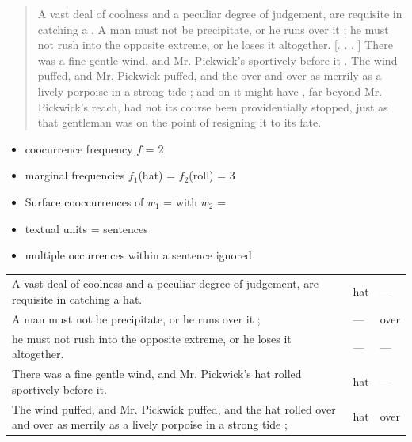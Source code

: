 \documentclass[a4paper,landscape,headrule,footrule,dvips]{foils}
\begin{document}
\begin{CJK}{UTF8}{min}
  \begin{quotation}
A vast deal of coolness and a peculiar degree of judgement, are requisite in catching a  . A man must
not be precipitate, or he runs over it ; he must not rush into the opposite extreme, or he loses it
altogether. [. . . ] There was a fine gentle \ul{wind, and Mr. Pickwick’s   sportively before it} . The
wind puffed, and Mr. \ul{Pickwick puffed, and the   over and over} as merrily as a lively porpoise
in a strong tide ; and on it might have , far beyond Mr. Pickwick’s reach, had not its course been
providentially stopped, just as that gentleman was on the point of resigning it to its fate.
  \end{quotation}
  \begin{itemize}
  \item coocurrence frequency $f$ = 2
  \item marginal frequencies $f_1$(hat) = $f_2$(roll) = 3
  \end{itemize}
  
\begin{itemize}
 \item Surface cooccurrences of 
    $w_1$ =  with $w_2$ = 
  \item textual units = sentences
  \item multiple occurrences within a sentence ignored
  \end{itemize}
  \begin{small}
    \begin{tabular}{p{}ll}
      A vast deal of coolness and a peculiar degree of judgement, are
      requisite in catching a hat.
      &
      hat
      &
      —
      \\
      A man must not be precipitate, or he runs over it ;
      &
      —
      &
      over
      \\
      he must not rush into the opposite extreme, or he loses it
      altogether.
      &
      —
      &
      —
      \\
      There was a fine gentle wind, and Mr. Pickwick’s hat rolled
      sportively before it.
      &
      hat
      &
      —
      \\
      The wind puffed, and Mr. Pickwick puffed, and the hat rolled
      over and over as merrily as a lively porpoise in a strong tide ;
      &
      hat
      &
      over
    \end{tabular}
  \end{small}


\end{CJK}
\end{document}
